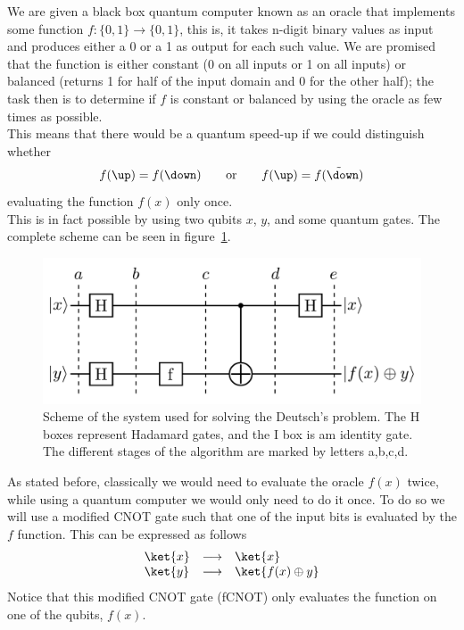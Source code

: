 We are given a black box quantum computer known as an oracle that implements some function $f:\{ 0,1\}\rightarrow\{ 0,1\}$, this is, it takes n-digit binary values as input and produces either a 0 or a 1 as output for each such value. We are promised that the function is either constant (0 on all inputs or 1 on all inputs) or balanced (returns 1 for half of the input domain and 0 for the other half); the task then is to determine if $f$ is constant or balanced by using the oracle as few times as possible. \\

This means that there would be a quantum speed-up if we could distinguish whether
\begin{equation}
  f(\up) = f(\down) \qquad \text{or}\qquad f(\up) = \tilde{f(\down)}
  \label{problem}
\end{equation}
evaluating the function $f(x)$ only once.\\

This is in fact possible by using two qubits $x$, $y$, and some quantum gates. The complete scheme can be seen in figure~\ref{fcnot}.
\begin{figure}[!h]
  \centering
  \includegraphics{chapter01/figures/fcnot.pdf}
  \vspace{-5pt}
  \caption{Scheme of the system used for solving the Deutsch's problem. The H boxes represent Hadamard gates, and the I box is am identity gate. The different stages of the algorithm are marked by letters a,b,c,d.}
  \label{fcnot}
\end{figure}
\FloatBarrier
As stated before, classically we would need to evaluate the oracle $f(x)$ twice, while using a quantum computer we would only need to do it once. To  do so we will use a modified CNOT gate such that one of the input bits is evaluated by the $f$ function. This can be expressed as follows
\begin{equation}
  \begin{array}{lcl}
    \ket{x} & \longrightarrow & \ket{x} \\
    \ket{y} & \longrightarrow & \ket{f(x)\oplus y}
  \end{array}
  \label{fCNOT}
\end{equation}
Notice that this modified CNOT gate (fCNOT) only evaluates the function on one of the qubits, $f(x)$.\\



